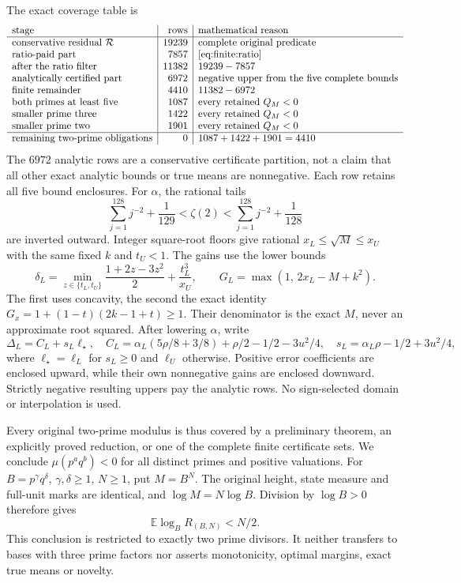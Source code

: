 \documentclass[11pt]{article}
\theoremstyle{definition}\newtheorem{definition}[theorem]{Definition}
\theoremstyle{remark}\newtheorem{remark}[theorem]{Remark}
\begin{document}
The exact coverage table is
\[
\begin{array}{l|r|l}
\hbox{stage}&\hbox{rows}&\hbox{mathematical reason}\\ \hline
\hbox{conservative residual }{\cal R}&19239&
 \hbox{complete original predicate}\\
\hbox{ratio-paid part}&7857&\eqref{eq:finite:ratio}\\
\hbox{after the ratio filter}&11382&19239-7857\\
\hbox{analytically certified part}&6972&
 \hbox{negative upper from the five complete bounds}\\
\hbox{finite remainder}&4410&11382-6972\\
\hbox{both primes at least five}&1087&\hbox{every retained }Q_M<0\\
\hbox{smaller prime three}&1422&\hbox{every retained }Q_M<0\\
\hbox{smaller prime two}&1901&\hbox{every retained }Q_M<0\\ \hline
\hbox{remaining two-prime obligations}&0&1087+1422+1901=4410
\end{array}
\]
The \(6972\) analytic rows are a conservative certificate partition,
not a claim that all other exact analytic bounds or true means are
nonnegative.  Each row retains all five bound enclosures.
For \(\alpha\), the rational tails
\[
 \sum_{j=1}^{128}j^{-2}+\frac1{129}<\zeta(2)
 <\sum_{j=1}^{128}j^{-2}+\frac1{128}
\]
are inverted outward.  Integer square-root floors give rational
\(x_L\le\sqrt M\le x_U\) with the same fixed \(k\) and \(t_U<1\).
The gains use the lower bounds
\[
 \delta_L=\min_{z\in\{t_L,t_U\}}\frac{1+2z-3z^2}{2}
                         +\frac{t_L^3}{x_U},\qquad
 G_L=\max(1,\,2x_L-M+k^2).
\]
The first uses concavity, the second the exact identity
\(G_x=1+(1-t)(2k-1+t)\ge1\).
Their denominator is the exact \(M\), never an approximate root squared.
After lowering \(\alpha\), write
\[
 \Delta_L=C_L+s_L\ell_\star,\quad
 C_L=\alpha_L(5\rho/8+3/8)+\rho/2-1/2-3u^2/4,\quad
 s_L=\alpha_L\rho-1/2+3u^2/4 ,
\]
where \(\ell_\star=\ell_L\) for \(s_L\ge0\) and \(\ell_U\) otherwise.
Positive error coefficients are enclosed upward, while their own
nonnegative gains are enclosed downward.  Strictly negative resulting
uppers pay the analytic rows.  No sign-selected domain or interpolation
is used.

Every original two-prime modulus is thus covered by a preliminary
theorem, an explicitly proved reduction, or one of the complete finite
certificate sets.  We conclude \(\mu(p^a q^b)<0\) for all distinct
primes and positive valuations.
For \(B=p^\gamma q^\delta\), \(\gamma,\delta\ge1\), \(N\ge1\),
put \(M=B^N\).  The original height, state measure and full-unit marks
are identical, and \(\log M=N\log B\).  Division by \(\log B>0\)
therefore gives
\[
 \mathbb E\log_B R_{(B,N)}<N/2 .
\]
This conclusion is restricted to exactly two prime divisors.
It neither transfers to bases with three prime factors nor asserts
monotonicity, optimal margins, exact true means or novelty.
\end{document}
